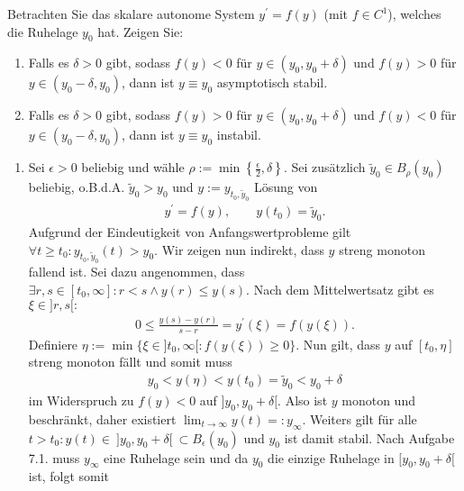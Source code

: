 \begin{exercise}
Betrachten Sie das skalare autonome System $y^{\prime} = f(y)$ (mit $f \in C^1$),
welches die Ruhelage $y_0$ hat. Zeigen Sie:
\begin{enumerate}[label = \textbf{\alph*)}]
  \item Falls es $\delta > 0$ gibt, sodass $f(y) < 0$ für $y \in (y_0,y_0 + \delta)$
und $f(y) > 0$ für $y \in (y_0 - \delta, y_0)$, dann ist $y \equiv y_0$
asymptotisch stabil.
\item Falls es $\delta > 0$ gibt, sodass $f(y) > 0$ für $y \in (y_0,y_0 + \delta)$
und $f(y) < 0$ für $y \in (y_0 - \delta, y_0)$, dann ist $y \equiv y_0$ instabil.
\end{enumerate}
\end{exercise}
\begin{solution}
  \phantom{}
\begin{enumerate}[label = \textbf{\alph*)}]
\item Sei $\epsilon > 0$ beliebig und wähle
$\rho := \min \left\{\frac{\epsilon}{2}, \delta \right\}$.
Sei zusätzlich $\widetilde{y}_0 \in B_{\rho}(y_0)$ beliebig, o.B.d.A. $\widetilde{y}_0 > y_0$
und $y := y_{t_0,\widetilde{y}_0}$ Lösung von
\begin{align*}
  y^{\prime} = f(y), \qquad y(t_0) = \widetilde{y}_0.
\end{align*}
Aufgrund der Eindeutigkeit von Anfangswertprobleme gilt
$\forall t \geq t_0: y_{t_0,\widetilde{y}_0}(t) > y_0$.
Wir zeigen nun indirekt, dass $y$ streng monoton fallend ist.
Sei dazu angenommen, dass $\exists r,s \in [t_0,\infty]: r < s \land y(r) \leq y(s)$.
Nach dem Mittelwertsatz gibt es $\xi \in ]r,s[:$
\begin{align*}
  0 \leq \frac{y(s)-y(r)}{s-r} = y^{\prime}(\xi) = f(y(\xi)).
\end{align*}
Definiere $\eta := \min \{\xi \in ]t_0,\infty[: f(y(\xi)) \geq 0 \}$.
Nun gilt, dass $y$ auf $[t_0, \eta]$ streng monoton fällt und somit muss
\begin{align*}
  y_0 < y(\eta) < y(t_0) = \widetilde{y}_0 < y_0 + \delta
\end{align*}
im Widerspruch zu $f(y) < 0$ auf $]y_0,y_0 + \delta[$.
Also ist $y$ monoton und beschränkt, daher existiert $\lim_{t \to \infty} y(t) =: y_{\infty}$.
Weiters gilt für alle $t > t_0: y(t) \in ~]y_0, y_0 + \delta[~ \subset B_{\epsilon}(y_0)$
und $y_0$ ist damit stabil.
Nach Aufgabe 7.1. muss $y_{\infty}$ eine Ruhelage sein und da $y_0$ die einzige
Ruhelage in $[y_0,y_0 + \delta[$ ist, folgt somit
\begin{align*}

\end{align*}
\end{enumerate}
\end{solution}
